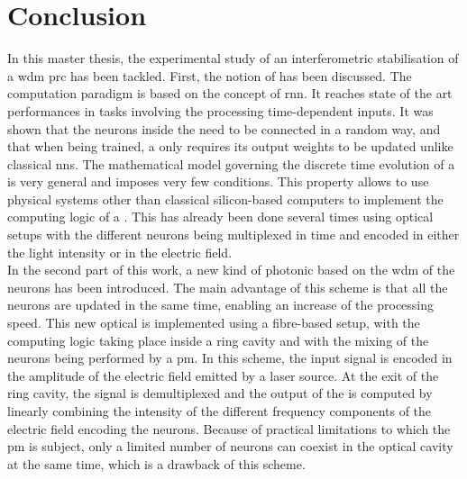 \chapter{Conclusion}

In this master thesis, the experimental study of an interferometric stabilisation of a \gls{wdm} \gls{prc} has been tackled. First, the notion of \rc has been discussed. The \rc computation paradigm is based on the concept of \gls{rnn}. It reaches state of the art performances in tasks involving the processing time-dependent inputs. It was shown that the neurons inside the \rcer need to be connected in a random way, and that when being trained, a \rcer only requires its output weights to be updated unlike classical \glspl{nn}. The mathematical model governing the discrete time evolution of a \rcer is very general and imposes very few conditions. This property allows to use physical systems other than classical silicon-based computers to implement the computing logic of a \rcer. This has already been done several times using optical setups with the different neurons being multiplexed in time and encoded in either the light intensity or in the electric field.\\

In the second part of this work, a new kind of photonic \rcer based on the \gls{wdm} of the neurons has been introduced. The main advantage of this scheme is that all the neurons are updated in the same time, enabling an increase of the processing speed. This new optical \rcer is implemented using a fibre-based setup, with the \rc computing logic taking place inside a ring cavity and with the mixing of the neurons being performed by a \gls{pm}. In this scheme, the input signal is encoded in the amplitude of the electric field emitted by a laser source. At the exit of the ring cavity, the signal is demultiplexed and the output of the \rcer is computed by linearly combining the intensity of the different frequency components of the electric field encoding the neurons. Because of practical limitations to which the \gls{pm} is subject, only a limited number of neurons can coexist in the optical cavity at the same time, which is a drawback of this scheme. \\

